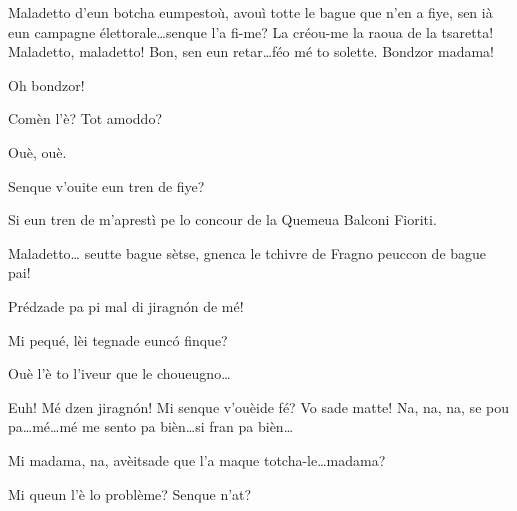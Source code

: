 \begin{drama}




\Cimaspeaks Maladetto d'eun botcha eumpestoù, avouì totte le bague que n'en a fiye, sen ià eun campagne élettorale\ldots senque l'a fi-me? La créou-me la raoua de la tsaretta! Maladetto, maladetto! Bon, sen eun retar\ldots féo mé to solette.  Bondzor madama!

\Saventaspeaks Oh bondzor!

\Cimaspeaks Comèn l'è? Tot amoddo?

\Saventaspeaks Ouè, ouè.

\Cimaspeaks Senque v'ouite eun tren de fiye?

\Saventaspeaks Si eun tren de m'aprestì pe lo concour de la Quemeua Balconi Fioriti.

\Cimaspeaks Maladetto\ldots {} seutte bague sètse, gnenca le tchivre de Fragno peuccon de bague pai!

\Saventaspeaks Prédzade pa pi mal di jiragn\'on de mé!

\Cimaspeaks Mi pequé, lèi tegnade eunc\'o finque?

\Saventaspeaks Ouè l'è to l'iveur que le choueugno\ldots


\Saventaspeaks {} Euh! Mé dzen jiragn\'on! Mi senque v'ouèide fé? Vo sade matte! Na, na, na, se pou pa\ldots mé\ldots mé me sento pa bièn\ldots si fran pa bièn\ldots


\Cimaspeaks Mi madama, na, avèitsade que l'a maque totcha-le\ldots madama?

\Marcospeaks {} Mi queun l'è lo problème? Senque n'at?


\end{drama}
